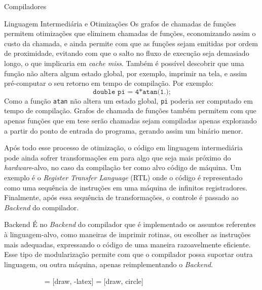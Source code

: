 \begin{section}{Compiladores}
\begin{subsection}{Linguagem Intermediária e Otimizações}
    Os grafos de chamadas de funções permitem otimizações que eliminem chamadas
de funções, economizando assim o custo da chamada, e ainda permite com que as
funções sejam emitidas por ordem de proximidade, evitando com que o salto no
fluxo de execução seja demasiado longo, o que implicaria em \textit{cache miss}.
Também é possível descobrir que uma função não altera algum estado global, por exemplo,
imprimir na tela, e assim pré-computar o seu retorno em tempo de compilação. Por
exemplo:
    $$ \texttt{double pi = 4*atan(1.);}$$
Como a função \texttt{atan} não altera um estado global, \texttt{pi} poderia
ser computado em tempo de compilação. Grafos de chamada de funções também
permitem com que apenas funções que em tese serão chamadas sejam compiladas
apenas explorando a partir do ponto de entrada do programa, gerando assim
um binário menor.

    Após todo esse processo de otimização, o código em linguagem intermediária
pode ainda sofrer transformações em para algo que seja mais próximo do
\textit{hardware}-alvo, no caso da compilação ter como alvo código de máquina.
Um exemplo é o \textit{Register Transfer Language} (RTL) onde o código é
representado como uma sequência de instruções em uma máquina de infinitos
registradores. Finalmente, após essa sequência de transformações, o controle é
passado ao \textit{Backend} do compilador.

\end{subsection}

\begin{subsection}{Backend}
    É no \textit{Backend} do compilador que é implementado os assuntos
referentes à linguagem-alvo, como maneiras de imprimir rotinas, ou escolher
as instruções mais adequadas, expressando o código de uma maneira razoavelmente
eficiente. Esse tipo de modularização permite com que o compilador possa
suportar outra linguagem, ou outra máquina, apenas reimplementando o
\textit{Backend}.
\end{subsection}

\begin{figure}[ht]
\centering
  \begin{subfigure}[b]{0.40\textwidth}
	 = [draw, -latex]
	 = [draw, circle]
	\begin{center}
\end{center}
\end{subfigure}
\end{figure}
\end{section}
